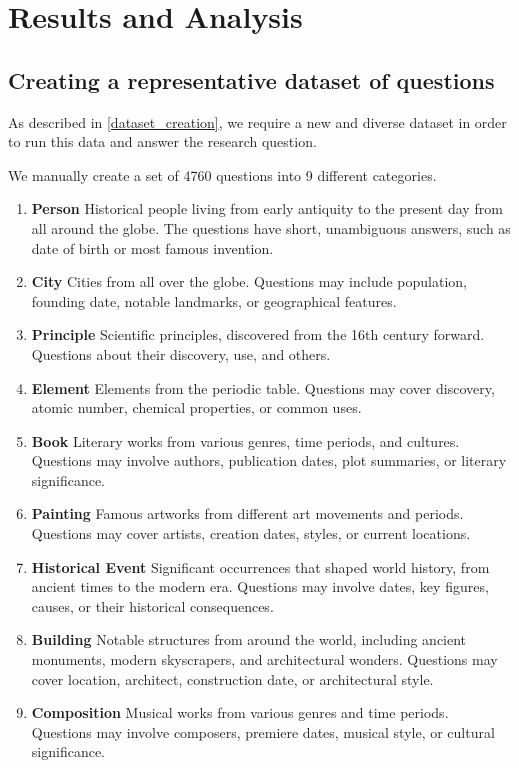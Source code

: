 \section{Results and Analysis}
\label{results_section}

\subsection{Creating a representative dataset of questions}
\label{creating_dataset}

As described in \cref{dataset_creation}, we require a new and diverse dataset in order to run this data and answer the research question.

We manually create a set of 4760 questions into 9 different categories.

\begin{enumerate}
	\item \textbf{Person} Historical people living from early antiquity to the present day from all around the globe. The questions have short, unambiguous answers, such as date of birth or most famous invention.
	\item \textbf{City} Cities from all over the globe. Questions may include population, founding date, notable landmarks, or geographical features.
	\item \textbf{Principle} Scientific principles, discovered from the 16th century forward. Questions about their discovery, use, and others.
	\item \textbf{Element} Elements from the periodic table. Questions may cover discovery, atomic number, chemical properties, or common uses.
	\item \textbf{Book} Literary works from various genres, time periods, and cultures. Questions may involve authors, publication dates, plot summaries, or literary significance.
	\item \textbf{Painting} Famous artworks from different art movements and periods. Questions may cover artists, creation dates, styles, or current locations.
	\item \textbf{Historical Event} Significant occurrences that shaped world history, from ancient times to the modern era. Questions may involve dates, key figures, causes, or their historical consequences.
	\item \textbf{Building} Notable structures from around the world, including ancient monuments, modern skyscrapers, and architectural wonders. Questions may cover location, architect, construction date, or architectural style.
	\item \textbf{Composition} Musical works from various genres and time periods. Questions may involve composers, premiere dates, musical style, or cultural significance.
\end{enumerate}

